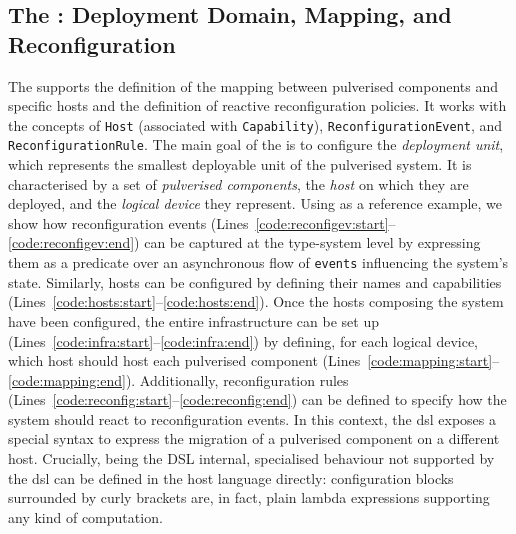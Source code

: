 \documentclass[conference]{IEEEtran}
\newcommand{\meta}[1]{{\color{blue}#1}}
\begin{document}
\subsection{The \dslDep{}: Deployment Domain, Mapping, and Reconfiguration}
\label{sec:contrib:dsldep}

The \dslDep{} supports the definition of the mapping between pulverised components and specific hosts
and the definition of reactive reconfiguration policies.
%
It works with the concepts of \texttt{Host}
(associated with \texttt{Capability}),
\texttt{ReconfigurationEvent},
and \texttt{ReconfigurationRule}.
%
\meta{
The main goal of the \dslDep{} is to configure the \emph{deployment unit},
which represents the smallest deployable unit of the pulverised system.
%
It is characterised by a set of \emph{pulverised components},
the \emph{host} on which they are deployed,
and the \emph{logical device} they represent. 
}
%
Using  as a reference example,
we show how reconfiguration events (Lines~\ref{code:reconfigev:start}--\ref{code:reconfigev:end}) can be captured at the type-system level
by expressing them as a predicate over an asynchronous flow of \texttt{events} influencing the system's state.
%
Similarly, hosts can be configured by defining their names and capabilities (Lines~\ref{code:hosts:start}--\ref{code:hosts:end}).
%
Once the hosts composing the system have been configured,
the entire infrastructure can be set up (Lines~\ref{code:infra:start}--\ref{code:infra:end}) by defining,
for each logical device,
which host should host each pulverised component (Lines~\ref{code:mapping:start}--\ref{code:mapping:end}).
%
Additionally,
reconfiguration rules (Lines~\ref{code:reconfig:start}--\ref{code:reconfig:end}) can be defined to specify how the system should react to reconfiguration events.
%
In this context, the \ac{dsl} exposes a special syntax to express the migration of a pulverised component on a different host.
%
Crucially, being the DSL internal,
specialised behaviour not supported by the \ac{dsl} can be defined in the host language directly:
configuration blocks surrounded by curly brackets are,
in fact,
plain lambda expressions supporting any kind of computation.

\makeatletter
\newcommand\currentStyle@lstparam{}
\lst@AddToHook{Output}{\global\let\currentStyle@lstparam\lst@thestyle}
\lst@AddToHook{OutputOther}{\global\let\currentStyle@lstparam\lst@thestyle}
\makeatother

\makeatletter
\newcommand{\crefe}[1]{\currentStyle@lstparam\Cref{#1}} %
\makeatother
\end{document}
